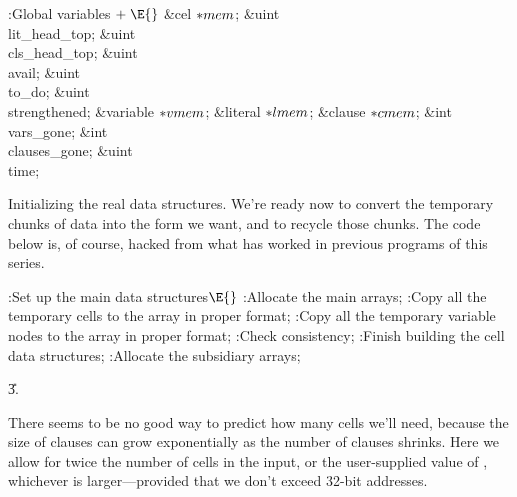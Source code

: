 \B{}:Global variables\X${}\mathrel+\E{}$\6
\&{cel} ${}{*}\\{mem}{}$;\6
\&{uint} \\{lit\_head\_top};\6
\&{uint} \\{cls\_head\_top};\6
\&{uint} \\{avail};\6
\&{uint} \\{to\_do};\6
\&{uint} \\{strengthened};\6
\&{variable} ${}{*}\\{vmem}{}$;\6
\&{literal} ${}{*}\\{lmem}{}$;\6
\&{clause} ${}{*}\\{cmem}{}$;\6
\&{int} \\{vars\_gone};\6
\&{int} \\{clauses\_gone};\6
\&{uint} \\{time};%
\par
\fi

Initializing the real data structures.
We're ready now to convert the temporary chunks of data into the
form we want, and to recycle those chunks. The code below is, of course,
hacked from what has worked in previous programs of this series.

\Y\B\4:Set up the main data structures\X${}\E{}$\6
:Allocate the main arrays\X;\6
:Copy all the temporary cells to the  array in proper format\X;%
\6
:Copy all the temporary variable nodes to the  array in proper
format\X;\6
:Check consistency\X;\6
:Finish building the cell data structures\X;\6
:Allocate the subsidiary arrays\X;\par
\U3.\fi

There seems to be no good way to predict how many cells we'll need,
because
the size of clauses can grow exponentially as the number of clauses shrinks.
Here we allow for twice the number of cells in the input, or the
user-supplied value of , whichever is larger---provided that
we don't exceed 32-bit addresses.

